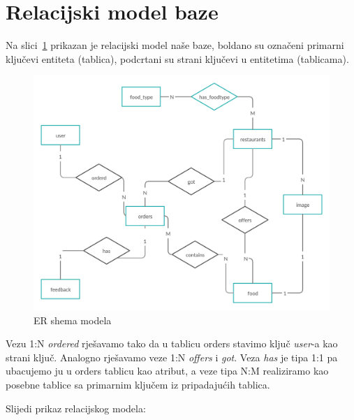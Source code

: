 \documentclass[12pt]{scrartcl}
\begin{document}
\section{Relacijski model baze}
Na slici~\ref{fig:er} prikazan je relacijski model naše baze, boldano su označeni primarni ključevi entiteta (tablica), podcrtani su strani ključevi u entitetima (tablicama).
\begin{figure}
    \centering
    \includegraphics[width=\textwidth]{slika.png}
    \caption{ER shema modela}
    \label{fig:er}
\end{figure}

Vezu 1:N \emph{ordered} rješavamo tako da u tablicu \textsf{orders} stavimo ključ \emph{user}-a kao strani ključ. Analogno rješavamo veze 1:N \emph{offers} i \emph{got}. Veza \emph{has} je tipa 1:1 pa ubacujemo ju u orders tablicu kao atribut, a veze tipa N:M realiziramo kao posebne tablice sa primarnim ključem iz pripadajućih tablica.

Slijedi prikaz relacijskog modela:
\end{document}
